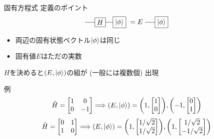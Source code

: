 \documentclass[dvipdfm]{beamer}
\begin{document}
\begin{frame}{固有方程式 定義のポイント}
    \begin{equation*}
        \vcenter{\hbox{
            \begin{tikzpicture}
                \node at(-1,0)[draw,rectangle](H){$H$};
                \node at(0,0)[draw,rectangle](psi){$\ket{\phi}$};
                \draw(H.east)--(psi.west)(H.west)--++(-.5,0);
            \end{tikzpicture}
        }}
        =
        E
        \vcenter{\hbox{
            \begin{tikzpicture}
                \node at(0,0)[draw,rectangle](psi){$\ket{\phi}$};
                \draw(psi.west)--++(-.5,0);
            \end{tikzpicture}
        }}
    \end{equation*}
    \begin{itemize}
        \item 両辺の固有状態ベクトル$\ket{\phi}$は同じ
        \item 固有値$E$はただの実数
    \end{itemize}
    $H$を決めると$(E, \ket{\phi})$の組が (一般には複数個) 出現
\end{frame}

\begin{frame}{例}
    \begin{equation*}
        \hat{H}
        =
        \mqty[
            1 & 0
            \\
            0 & -1
        ]
        \Longrightarrow
        (E,\ket{\phi})
        =
        \qty(1,\mqty[1\\0]),
        \qty(-1,\mqty[0\\1])
    \end{equation*}
    \begin{equation*}
        \hat{H}
        =
        \mqty[
            0 & 1
            \\
            1 & 0
        ]
        \Longrightarrow
        (E,\ket{\phi})
        =
        \qty(1,\mqty[1/\sqrt{2}\\1/\sqrt{2}]),
        \qty(1,\mqty[1/\sqrt{2}\\-1/\sqrt{2}])
    \end{equation*}
\end{frame}
\end{document}
